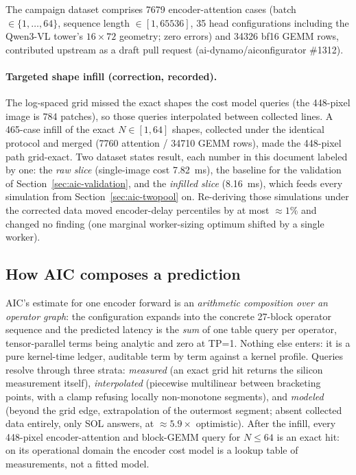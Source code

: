 The campaign dataset comprises \num{7679} encoder-attention cases (batch
$\in\{1,\dots,64\}$, sequence length $\in[1, 65536]$, 35 head
configurations including the Qwen3-VL tower's $16\times 72$ geometry; zero
errors) and \num{34326} bf16 GEMM rows, contributed upstream as a draft
pull request (ai-dynamo/aiconfigurator \#1312).

\paragraph{Targeted shape infill (correction, recorded).} The log-spaced
grid missed the exact shapes the cost model queries (the 448-pixel image is
784 patches), so those queries interpolated between collected lines. A
465-case infill of the exact $N \in [1,64]$ shapes, collected under the
identical protocol and merged (\num{7760} attention / \num{34710} GEMM
rows), made the 448-pixel path grid-exact. Two dataset states result, each
number in this document labeled by one: the \emph{raw slice} (single-image
cost \SI{7.82}{\milli\second}), the baseline for the validation of
Section~\ref{sec:aic-validation}, and the \emph{infilled slice}
(\SI{8.16}{\milli\second}), which feeds every simulation from
Section~\ref{sec:aic-twopool} on. Re-deriving those simulations under the
corrected data moved encoder-delay percentiles by at most ${\approx}1\%$ and
changed no finding (one marginal worker-sizing optimum shifted by a single
worker).

\subsection{How AIC composes a prediction}
\label{sec:aic-composition}

AIC's estimate for one encoder forward is an \emph{arithmetic composition
over an operator graph}: the configuration expands into the concrete
27-block operator sequence and the predicted latency is the \emph{sum} of
one table query per operator, tensor-parallel terms being analytic and zero
at TP=1. Nothing else enters: it is a pure kernel-time ledger, auditable
term by term against a kernel profile. Queries resolve through three strata:
\emph{measured} (an exact grid hit returns the silicon measurement itself),
\emph{interpolated} (piecewise multilinear between bracketing points, with a
clamp refusing locally non-monotone segments), and \emph{modeled} (beyond
the grid edge, extrapolation of the outermost segment; absent collected data
entirely, only SOL answers, at ${\approx}5.9\times$ optimistic). After the
infill, every 448-pixel
encoder-attention and block-GEMM query for $N \le 64$ is an exact hit: on
its operational domain the encoder cost model is a lookup table of
measurements, not a fitted model.

